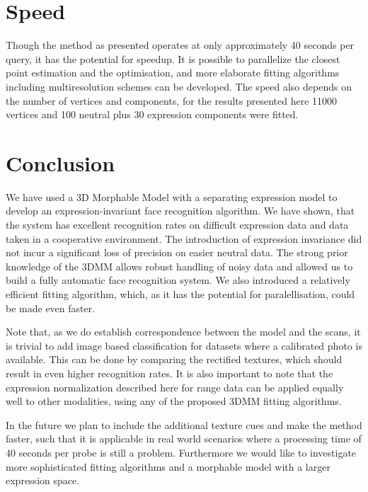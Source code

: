 \documentclass[10pt,twocolumn,letterpaper]{article}
\begin{document}

\section{Speed}
Though the method as presented operates at only approximately 40 seconds per
query, it has the potential for speedup. It is possible to parallelize the
closest point estimation and the optimisation, and more elaborate fitting
algorithms including multiresolution schemes can be developed. The speed also
depends on the number of vertices and components, for the results presented
here 11000 vertices and 100 neutral plus 30 expression components were fitted.

\section{Conclusion}
We have used a 3D Morphable Model with a separating expression model to develop
an expression-invariant face recognition algorithm. We have shown, that the
system has excellent recognition rates on difficult expression data and data
taken in a cooperative environment. The introduction of expression invariance
did not incur a significant loss of precision on easier neutral data. The strong prior
knowledge of the 3DMM allows robust handling of noisy data and allowed us to
build a fully automatic face recognition system. We also introduced a relatively
efficient fitting algorithm, which, as it has the potential for
paralellisation, could be made even faster. 

Note that, as we do establish correspondence between the model and the scans,
it is trivial to add image based classification for datasets where a calibrated
photo is available. This can be done by comparing the rectified textures,
which should result in even higher recognition rates. It is also important to
note that the expression normalization described here for range data can be
applied equally well to other modalities, using any of the proposed 3DMM
fitting algorithms.

In the future we plan to include the additional texture cues and make the
method faster, such that it is applicable in real world scenarios where a
processing time of 40 seconds per probe is still a problem. Furthermore we
would like to investigate more sophisticated fitting algorithms and a morphable
model with a larger expression space.


{\small


}
\end{document}
